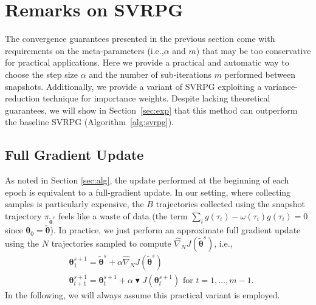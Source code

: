 \documentclass{article}
\makeatletter
\theoremstyle{remark}
\theoremstyle{definition}
\DeclareRobustCommand{\ie}{i.e.,\@\xspace}
\newcommand{\vtheta}{\boldsymbol{\theta}}
\newcommand{\gradApp}[2]{\widehat{\nabla}_{#2}J(#1)}
\newcommand{\wt}[1]{\widetilde{#1}}
\makeatother
\begin{document}
\section{Remarks on SVRPG}
The convergence guarantees presented in the previous section come with requirements on the meta-parameters (\ie $\alpha$ and $m$) that may be too conservative for practical applications.
Here we provide a practical and automatic way to choose the step size $\alpha$ and the number of sub-iterations $m$ performed between snapshots.
Additionally, we provide a variant of SVRPG exploiting a variance-reduction technique for importance weights.
Despite lacking theoretical guarantees, we will show in Section~\ref{sec:exp} that this method can outperform the baseline SVRPG (Algorithm~\ref{alg:svrpg}).

\subsection{Full Gradient Update}
As noted in Section \ref{sec:alg}, the update performed at the beginning of each epoch is equivalent to a full-gradient update. In our setting, where collecting samples is particularly expensive, the $B$ trajectories collected using the snapshot trajectory $\pi_{\wt{\vtheta}^s}$ feels like a waste of data (the term $\sum_i g(\tau_i) - \omega(\tau_i) g(\tau_i) =0$ since $\vtheta_0 = \wt{\vtheta}$).
In practice, we just perform an approximate full gradient update using the $N$ trajectories sampled to compute $\gradApp{\wt{\vtheta}^s}{N}$, \ie
\begin{align*}
	&\vtheta_{1}^{s+1} = \wt{\vtheta}^s + \alpha\gradApp{\wt{\vtheta}^s}{N} \\
	&\vtheta_{t+1}^{s+1} = \vtheta_t^{s+1} + \alpha 
        \blacktriangledown J(\vtheta^{s+1}_t)
        \text{ for $t=1,\dots,m-1$}.
\end{align*}
In the following, we will always assume this practical variant is employed.
\end{document}
